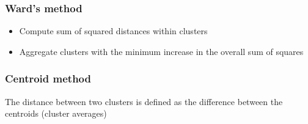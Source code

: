 \documentclass[a4paper,12pt]{article}
\begin{document}

\subsubsection{Ward's method}
\begin{itemize}
	\item  Compute sum of squared distances within clusters
	\item  Aggregate clusters with the minimum increase in the
	overall sum of squares
\end{itemize}
\subsubsection{Centroid method}
The distance between two clusters is defined as the
difference between the centroids (cluster averages)
\end{document}
